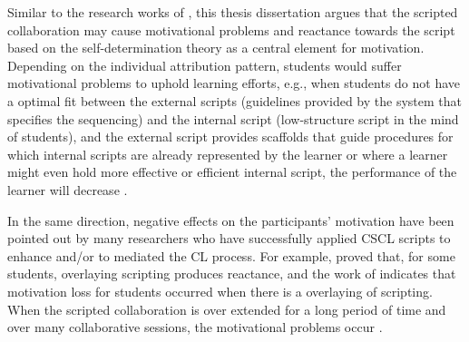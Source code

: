 Similar to the research works of , this thesis dissertation argues that the scripted collaboration may cause motivational problems and reactance towards the script based on the self-determination theory \cite{DeciRyan2010} as a central element for motivation. Depending on the individual attribution pattern, students would suffer motivational problems to uphold learning efforts, e.g., when students do not have a optimal fit between the external scripts (guidelines provided by the system that specifies the sequencing) and the internal script (low-structure script in the mind of students), and the external script provides scaffolds that guide procedures for which internal scripts are already represented by the learner or where a learner might even hold more effective or efficient internal script, the performance of the learner will decrease \cite{StegmannMuGehlen-BaumFischer2011}.

In the same direction, negative effects on the participants' motivation have been pointed out by many researchers who have successfully applied CSCL scripts to enhance and/or to mediated the CL process. For example,  proved that, for some students, overlaying scripting produces reactance, and the work of  indicates that motivation loss for students occurred when there is a overlaying of scripting. When the scripted collaboration is over extended for a long period of time and over many collaborative sessions, the motivational problems occur \cite{HronHesseReinhardPicard1997,SchmittWeinberger2018}.



